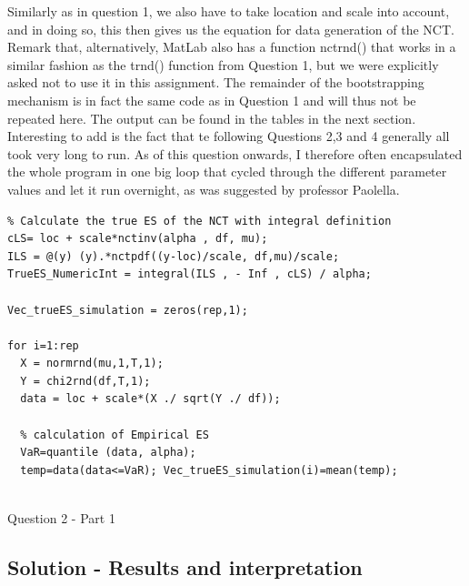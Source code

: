 \documentclass[12pt]{article}
\begin{document}
Similarly as in question 1, we also have to take location and scale into account, and in doing so, this then gives us the equation for data generation of the NCT. Remark that, alternatively, MatLab also has a function nctrnd() that works in a similar fashion as the trnd() function from Question 1, but we were explicitly asked not to use it in this assignment.
The remainder of the bootstrapping mechanism is in fact the same code as in Question 1 and will thus not be repeated here. The output can be found in the tables in the next section.\newline \newline
Interesting to add is the fact that te following Questions 2,3 and 4 generally all took very long to run. As of this question onwards, I therefore often encapsulated the whole program in one big loop that cycled through the different parameter values and let it run overnight, as was suggested by professor Paolella.

\begin{Program}[!htb]
\begin{lstlisting}[style=Matlab-editor,basicstyle=\mlttfamily\footnotesize]
%% Question 2 -------------------------------------------------------------
% Calculate the true ES of the NCT with integral definition
cLS= loc + scale*nctinv(alpha , df, mu); 
ILS = @(y) (y).*nctpdf((y-loc)/scale, df,mu)/scale; 
TrueES_NumericInt = integral(ILS , - Inf , cLS) / alpha; 

Vec_trueES_simulation = zeros(rep,1);

for i=1:rep
  X = normrnd(mu,1,T,1); 
  Y = chi2rnd(df,T,1);
  data = loc + scale*(X ./ sqrt(Y ./ df)); 
  
  % calculation of Empirical ES
  VaR=quantile (data, alpha); 
  temp=data(data<=VaR); Vec_trueES_simulation(i)=mean(temp); 
  
\end{lstlisting}
\caption{Question 2 - Part 1}
\label{Question 2 - Part 1}
\end{Program}


\subsection*{Solution - Results and interpretation}
\end{document}
